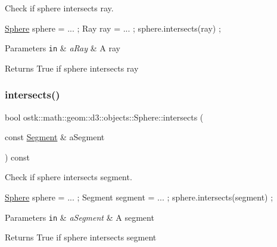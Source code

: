 Check if sphere intersects ray. 


\begin{DoxyCode}
\hyperlink{classostk_1_1math_1_1geom_1_1d3_1_1objects_1_1_sphere_a6920f72260a7b2c9ffc29283540e16c2}{Sphere} sphere = ... ;
Ray ray = ... ;
sphere.intersects(ray) ;
\end{DoxyCode}



\begin{DoxyParams}[1]{Parameters}
\mbox{\tt in}  & {\em a\+Ray} & A ray \\
\hline
\end{DoxyParams}
\begin{DoxyReturn}{Returns}
True if sphere intersects ray 
\end{DoxyReturn}
\mbox{\label{classostk_1_1math_1_1geom_1_1d3_1_1objects_1_1_sphere_afccce29f97045441ccc5b6bf37566d18}} 
\subsubsection{\texorpdfstring{intersects()}{intersects()}\hspace{0.1cm}{\footnotesize\ttfamily [5/9]}}
{\footnotesize\ttfamily bool ostk\+::math\+::geom\+::d3\+::objects\+::\+Sphere\+::intersects (\begin{DoxyParamCaption}\item[{const \hyperlink{classostk_1_1math_1_1geom_1_1d3_1_1objects_1_1_segment}{Segment} \&}]{a\+Segment }\end{DoxyParamCaption}) const}



Check if sphere intersects segment. 


\begin{DoxyCode}
\hyperlink{classostk_1_1math_1_1geom_1_1d3_1_1objects_1_1_sphere_a6920f72260a7b2c9ffc29283540e16c2}{Sphere} sphere = ... ;
Segment segment = ... ;
sphere.intersects(segment) ;
\end{DoxyCode}



\begin{DoxyParams}[1]{Parameters}
\mbox{\tt in}  & {\em a\+Segment} & A segment \\
\hline
\end{DoxyParams}
\begin{DoxyReturn}{Returns}
True if sphere intersects segment 
\end{DoxyReturn}
\mbox{\label{classostk_1_1math_1_1geom_1_1d3_1_1objects_1_1_sphere_a04479c6d128c10c2395884a82c5abcad}} 
